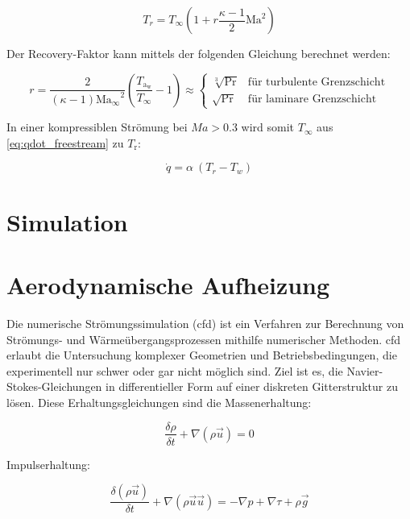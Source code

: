 \begin{equation}
  \label{eq:recovery_temperatur}
  T_r = T_{\infty} \left( 1 + r \frac{\kappa - 1}{2} \text{Ma}^2 \right)
\end{equation}

Der Recovery-Faktor kann mittels der folgenden Gleichung berechnet werden:

\begin{equation}
  \label{eq:recovery_faktor}
  r = \frac{2}{\left( \kappa - 1 \right) \mathrm{Ma_{\infty}}^2} \left( \frac{T_\mathrm{a_{w}}}{T_{\infty}} - 1 \right) \approx
  \begin{cases}
    \sqrt[3]{\text{Pr}} & \text{für turbulente Grenzschicht}\\
    \sqrt{\text{Pr}} & \text{für laminare Grenzschicht}
  \end{cases}
\end{equation}

In einer kompressiblen Strömung bei $Ma > 0.3$ wird somit $T_{\infty}$ aus \ref{eq:qdot_freestream} zu $T_\text{r}$:

\begin{equation}
  \label{eq:qdot_recovery}
  \dot{q} = \alpha \ (T_r - T_w)
\end{equation}

\section{Simulation}
\section*{Aerodynamische Aufheizung}

Die numerische Strömungssimulation (\ac{cfd}) ist ein Verfahren zur Berechnung von Strömungs- und Wärmeübergangsprozessen
mithilfe numerischer Methoden. \ac{cfd} erlaubt die Untersuchung komplexer Geometrien und Betriebsbedingungen,
die experimentell nur schwer oder gar nicht möglich sind. Ziel ist es, die Navier-Stokes-Gleichungen in differentieller Form auf einer
diskreten Gitterstruktur zu lösen. Diese Erhaltungsgleichungen sind die Massenerhaltung:

\begin{equation}
  \label{eq:navier_massenerhaltung}
  \frac{\delta \rho}{\delta t} + \nabla \left( \rho \vec{u} \right) = 0
\end{equation}

Impulserhaltung:

\begin{equation}
  \label{eq:navier_impulserhaltung}
  \frac{\delta \left( \rho \vec{u} \right)}{\delta t} + \nabla \left( \rho \vec{u} \vec{u} \right) = -\nabla p + \nabla \tau + \rho \vec{g}
\end{equation}

